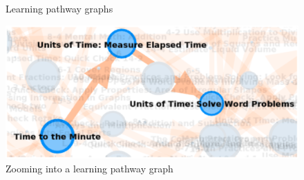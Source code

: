 \documentclass{edm_template}
\begin{document}
\begin{figure}
\centering
{}%
\qquad
{}%
\caption{Learning pathway graphs}
\end{figure}

\begin{figure}
\centering
\includegraphics[scale=.3]{graph3.ps}
\caption{Zooming into a learning pathway graph}
\end{figure}
\end{document}
